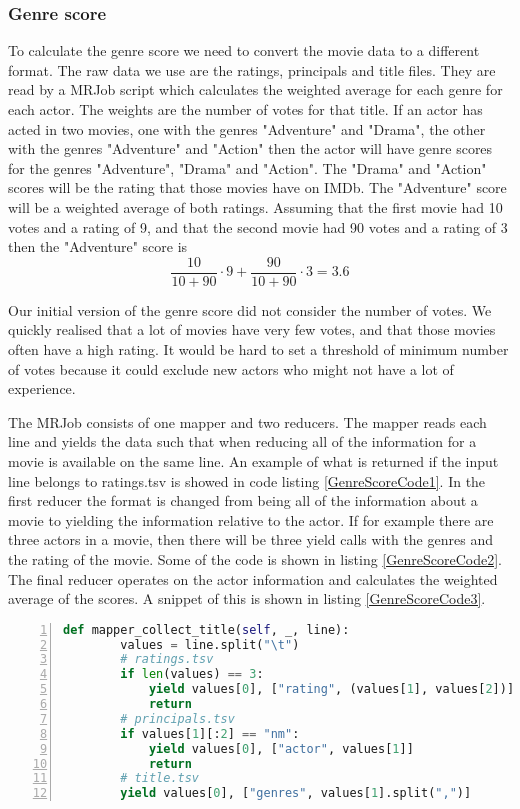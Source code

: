\subsubsection{Genre score}

To calculate the genre score we need to convert the movie data to a different format. The raw data we use are the ratings, principals and title files. They are read by a MRJob script which calculates the weighted average for each genre for each actor. The weights are the number of votes for that title. If an actor has acted in two movies, one with the genres "Adventure" and "Drama", the other with the genres "Adventure" and "Action" then the actor will have genre scores for the genres "Adventure", "Drama" and "Action". The "Drama" and "Action" scores will be the rating that those movies have on IMDb. The "Adventure" score will be a weighted average of both ratings. Assuming that the first movie had 10 votes and a rating of 9, and that the second movie had 90 votes and a rating of 3 then the "Adventure" score is $$\frac{10}{10+90}\cdot9+\frac{90}{10+90}\cdot3=3.6$$

Our initial version of the genre score did not consider the number of votes. We quickly realised that a lot of movies have very few votes, and that those movies often have a high rating. It would be hard to set a threshold of minimum number of votes because it could exclude new actors who might not have a lot of experience.

The MRJob consists of one mapper and two reducers. The mapper reads each line and yields the data such that when reducing all of the information for a movie is available on the same line. An example of what is returned if the input line belongs to ratings.tsv is showed in code listing \ref{GenreScoreCode1}. In the first reducer the format is changed from being all of the information about a movie to yielding the information relative to the actor. If for example there are three actors in a movie, then there will be three yield calls with the genres and the rating of the movie. Some of the code is shown in listing \ref{GenreScoreCode2}. The final reducer operates on the actor information and calculates the weighted average of the scores. A snippet of this is shown in listing \ref{GenreScoreCode3}.



\begin{lstlisting}[float=h!, language=Python, caption=Genre score mapper, label=GenreScoreCode1, numbers=left]
def mapper_collect_title(self, _, line):
        values = line.split("\t")
        # ratings.tsv
        if len(values) == 3:
            yield values[0], ["rating", (values[1], values[2])]
            return
        # principals.tsv
        if values[1][:2] == "nm":
            yield values[0], ["actor", values[1]]
            return
        # title.tsv
        yield values[0], ["genres", values[1].split(",")]
\end{lstlisting}



